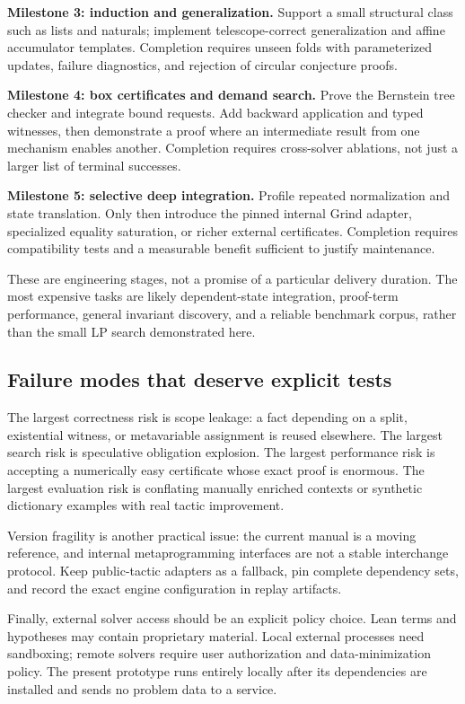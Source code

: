 \documentclass[11pt,a4paper]{article}
\begin{document}
\textbf{Milestone 3: induction and generalization.} Support a small structural class such as lists and naturals; implement telescope-correct generalization and affine accumulator templates. Completion requires unseen folds with parameterized updates, failure diagnostics, and rejection of circular conjecture proofs.

\textbf{Milestone 4: box certificates and demand search.} Prove the Bernstein tree checker and integrate bound requests. Add backward application and typed witnesses, then demonstrate a proof where an intermediate result from one mechanism enables another. Completion requires cross-solver ablations, not just a larger list of terminal successes.

\textbf{Milestone 5: selective deep integration.} Profile repeated normalization and state translation. Only then introduce the pinned internal Grind adapter, specialized equality saturation, or richer external certificates. Completion requires compatibility tests and a measurable benefit sufficient to justify maintenance.

These are engineering stages, not a promise of a particular delivery duration. The most expensive tasks are likely dependent-state integration, proof-term performance, general invariant discovery, and a reliable benchmark corpus, rather than the small LP search demonstrated here.

\subsection{Failure modes that deserve explicit tests}
The largest correctness risk is scope leakage: a fact depending on a split, existential witness, or metavariable assignment is reused elsewhere. The largest search risk is speculative obligation explosion. The largest performance risk is accepting a numerically easy certificate whose exact proof is enormous. The largest evaluation risk is conflating manually enriched contexts or synthetic dictionary examples with real tactic improvement.

Version fragility is another practical issue: the current manual is a moving reference, and internal metaprogramming interfaces are not a stable interchange protocol. Keep public-tactic adapters as a fallback, pin complete dependency sets, and record the exact engine configuration in replay artifacts.

Finally, external solver access should be an explicit policy choice. Lean terms and hypotheses may contain proprietary material. Local external processes need sandboxing; remote solvers require user authorization and data-minimization policy. The present prototype runs entirely locally after its dependencies are installed and sends no problem data to a service.
\end{document}
